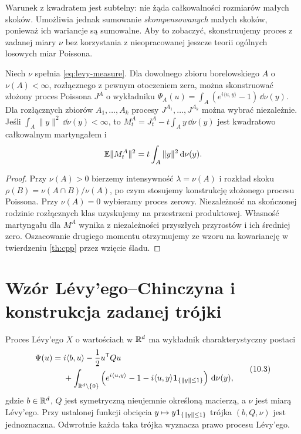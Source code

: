 Warunek z kwadratem jest subtelny: nie żąda całkowalności
rozmiarów małych skoków. Umożliwia jednak sumowanie
\emph{skompensowanych} małych skoków, ponieważ ich wariancje
są sumowalne. Aby to zobaczyć, skonstruujemy proces z zadanej
miary $\nu$ bez korzystania z nieopracowanej jeszcze teorii
ogólnych losowych miar Poissona.

\begin{lemat}
\label{lem:annular}
Niech $\nu$ spełnia \eqref{eq:levy-measure}. Dla dowolnego
zbioru borelowskiego $A$ o $\nu(A)<\infty$, rozłącznego z
pewnym otoczeniem zera, można skonstruować złożony proces
Poissona $J^A$ o wykładniku
$\Psi_A(u)=\int_A(e^{i\langle u,y\rangle}-1)\,\dd\nu(y)$.
Dla rozłącznych zbiorów $A_1,\ldots,A_k$ procesy
$J^{A_1},\ldots,J^{A_k}$ można wybrać niezależnie.
Jeśli $\int_A\|y\|^2\,\dd\nu(y)<\infty$, to
$M_t^A=J_t^A-t\int_Ay\,\dd\nu(y)$ jest
kwadratowo całkowalnym martyngałem i
\[
\mathbb{E}\|M_t^A\|^2=t\int_A\|y\|^2\,\mathrm{d}\nu(y).
\]
\end{lemat}
\begin{proof}
Przy $\nu(A)>0$ bierzemy intensywność
$\lambda=\nu(A)$ i rozkład skoku
$\rho(B)=\nu(A\cap B)/\nu(A)$, po czym stosujemy
konstrukcję złożonego procesu Poissona. Przy $\nu(A)=0$
wybieramy proces zerowy. Niezależność na skończonej rodzinie
rozłącznych klas uzyskujemy na przestrzeni produktowej.
Własność martyngału dla $M^A$ wynika z niezależności
przyszłych przyrostów i ich średniej zero.
Oszacowanie drugiego momentu otrzymujemy ze wzoru na
kowariancję w twierdzeniu \ref{th:cpp} przez wzięcie śladu.
\end{proof}

\section{Wzór Lévy'ego--Chinczyna i konstrukcja zadanej trójki}

\begin{twierdzenie}
\label{th:LK}
Proces Lévy'ego $X$ o wartościach w $\mathbb{R}^d$ ma wykładnik
charakterystyczny postaci
\[
\begin{split}
\Psi(u)={}&i\langle b,u\rangle-\frac12u^{\mathsf T}Qu\\
&+\int_{\mathbb{R}^d\setminus\{0\}}
\left(e^{i\langle u,y\rangle}-1
-i\langle u,y\rangle\mathbf{1}_{\{\|y\|\le1\}}\right)\,\mathrm{d}\nu(y),
\end{split}
\tag{10.3}\label{eq:LK}
\]
gdzie $b\in\mathbb{R}^d$, $Q$ jest symetryczną
nieujemnie określoną macierzą, a $\nu$ jest miarą
Lévy'ego. Przy ustalonej funkcji obcięcia
$y\mapsto y\mathbf{1}_{\{\|y\|\le1\}}$ trójka $(b,Q,\nu)$
jest jednoznaczna. Odwrotnie każda taka trójka wyznacza
prawo procesu Lévy'ego.
\end{twierdzenie}

